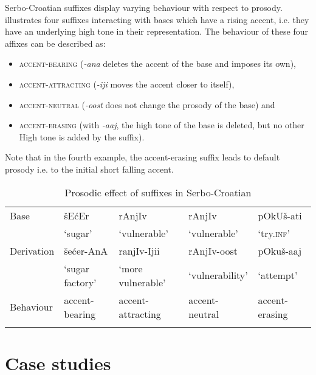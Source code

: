 \documentclass[output=paper]{langsci/langscibook}
\begin{document}
Serbo-Croatian suffixes display varying behaviour with respect to prosody.  illustrates four suffixes interacting with bases which have a rising accent, i.e. they have an underlying high tone in their representation. The behaviour of these four affixes can be described as:\begin{itemize}
  \item \textsc{accent-bearing} (\textit{-ana} deletes the accent of the base and imposes its own),
  \item \textsc{accent-attracting} (\textit{-iji} moves the accent closer to itself),
  \item \textsc{accent-neutral} (\textit{-oost} does not change the prosody of the base) and 
  \item \textsc{accent-erasing} (with \textit{-aaj}, the high tone of the base is deleted, but no other High tone is added by the suffix). 
  \end{itemize}
Note that in the fourth example, the accent-erasing suffix leads to default prosody i.e. to the initial short falling accent. 

\begin{table}
\small
\caption{Prosodic effect of suffixes in Serbo-Croatian}
\label{tab2}
 \begin{tabular}{l l l l l }
\lsptoprule
Base  & 
šEćEr  &
rAnjIv
 & rAnjIv
 & pOkUš-ati       
 \\ & `sugar' & `vulnerable' & `vulnerable' & `try.\textsc{inf}'\smallskip \\Derivation & šećer-AnA
  & ranjIv-Ijii
 & rAnjIv-oost
 & pOkuš-aaj
  \\

 &  `sugar 
factory'
 & 
`more vulnerable' & 
`vulnerability' & 
`attempt'\smallskip
  \\
Behaviour
  & 
accent-bearing & 
accent-attracting & accent-neutral & 
accent-erasing
 \\
 \lspbottomrule
 \end{tabular}
\end{table}

\section{Case studies
} \label{sec:simonovic:4}
\end{document}

